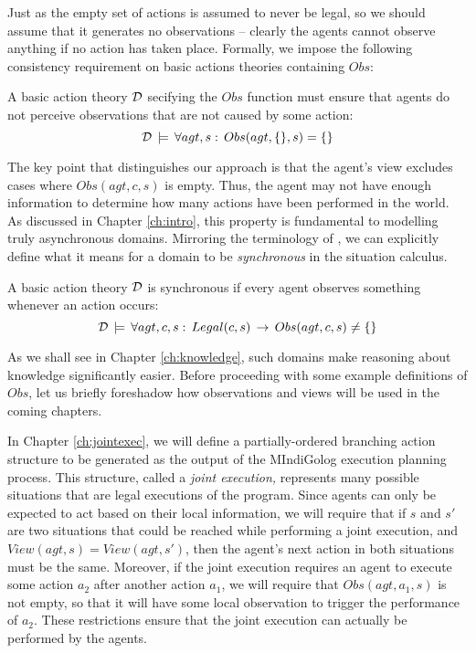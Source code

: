 Just as the empty set of actions is assumed to never be legal, so
we should assume that it generates no observations -- clearly the
agents cannot observe anything if no action has taken place. Formally,
we impose the following consistency requirement on basic actions theories
containing $Obs$:

\begin{defnL}
 A basic action theory
$\mathcal{D}$ secifying the $Obs$ function must ensure that agents do not
perceive observations that are not caused by some action:\[
\mathcal{D}\,\models\,\forall agt,s:\, Obs(agt,\{\},s)=\{\}\]

\end{defnL}
The key point that distinguishes our approach is that the agent's
view excludes cases where $Obs(agt,c,s)$ is empty. Thus, the agent
may not have enough information to determine how many actions have
been performed in the world. As discussed in Chapter \ref{ch:intro},
this property is fundamental to modelling truly asynchronous domains.
Mirroring the terminology of \citep{vanBentham06tree_of_knowledge},
we can explicitly define what it means for a domain to be \emph{synchronous}
in the situation calculus.

\begin{defnL}
 A basic action theory $\mathcal{D}$
is synchronous if every agent observes something whenever an action
occurs:\[
\mathcal{D}\,\models\,\forall agt,c,s:\, Legal(c,s)\,\rightarrow\, Obs(agt,c,s)\neq\{\}\]

\end{defnL}
As we shall see in Chapter \ref{ch:knowledge}, such domains make
reasoning about knowledge significantly easier. Before proceeding
with some example definitions of $Obs$, let us briefly foreshadow
how observations and views will be used in the coming chapters.

In Chapter \ref{ch:jointexec}, we will define a partially-ordered
branching action structure to be generated as the output of the MIndiGolog
execution planning process. This structure, called a \emph{joint execution,}
represents many possible situations that are legal executions of the
program. Since agents can only be expected to act based on their local
information, we will require that if $s$ and $s'$ are two situations
that could be reached while performing a joint execution, and $View(agt,s)=View(agt,s')$,
then the agent's next action in both situations must be the same.
Moreover, if the joint execution requires an agent to execute some
action $a_{2}$ after another action $a_{1}$, we will require that
$Obs(agt,a_{1},s)$ is not empty, so that it will have some local
observation to trigger the performance of $a_{2}$. These restrictions
ensure that the joint execution can actually be performed by the agents.

